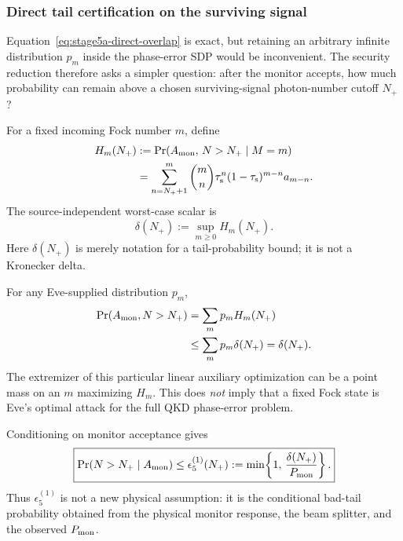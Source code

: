 \documentclass[11pt]{article}
\theoremstyle{remark}
\begin{document}
\subsubsection{Direct tail certification on the surviving signal}

Equation~\eqref{eq:stage5a-direct-overlap} is exact, but retaining an arbitrary
infinite distribution \(p_m\) inside the phase-error SDP would be inconvenient.
The security reduction therefore asks a simpler question: after the monitor
accepts, how much probability can remain above a chosen surviving-signal
photon-number cutoff \(N_+\)?

For a fixed incoming Fock number \(m\), define
\begin{equation}
\begin{aligned}
    H_m(N_+)
    &:=
    \Pr(A_{\rm mon},\,N>N_+\mid M=m)
    \\
    &=
    \sum_{n=N_++1}^{m}
      \binom mn
      \tau_{\rm s}^{n}
      (1-\tau_{\rm s})^{m-n}
      a_{m-n}.
    \label{eq:stage5a-Hm}
\end{aligned}
\end{equation}
The source-independent worst-case scalar is
\begin{equation}
    \boxed{
    \delta(N_+)
    :=
    \sup_{m\ge0}H_m(N_+).
    }
    \label{eq:stage5a-delta}
\end{equation}
Here \(\delta(N_+)\) is merely notation for a tail-probability bound; it is not
a Kronecker delta.

For any Eve-supplied distribution \(p_m\),
\begin{align}
    \Pr(A_{\rm mon},N>N_+)
    &=
    \sum_m p_mH_m(N_+)
    \nonumber\\
    &\le
    \sum_m p_m\delta(N_+)
    =
    \delta(N_+).
    \label{eq:stage5a-unconditional-tail}
\end{align}
The extremizer of this particular linear auxiliary optimization can be a point
mass on an \(m\) maximizing \(H_m\).  This does \emph{not} imply that a fixed
Fock state is Eve's optimal attack for the full QKD phase-error problem.

Conditioning on monitor acceptance gives
\begin{equation}
    \boxed{
    \Pr(N>N_+\mid A_{\rm mon})
    \le
    \epsilon_5^{(1)}(N_+)
    :=
    \min\!\left\{
      1,\,
      \frac{\delta(N_+)}{P_{\rm mon}}
    \right\}.
    }
    \label{eq:stage5a-conditional-tail}
\end{equation}
Thus \(\epsilon_5^{(1)}\) is not a new physical assumption: it is the
conditional bad-tail probability obtained from the physical monitor response,
the beam splitter, and the observed \(P_{\rm mon}\).
\end{document}
